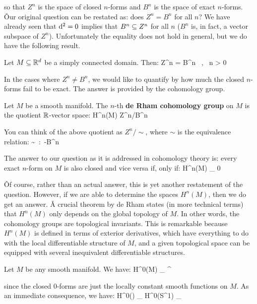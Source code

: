 so that $Z^n$ is the space of closed $n$-forms and $B^n$ is the space of exact $n$-forms. \v

Our original question can be restated as: does $Z^n=B^n$ for all $n$? We have already seen that $\mathrm{d}^2=0$ implies that
$B^n\subseteq Z^n$ for all $n$ ($B^n$ is, in fact, a vector subspace of $Z^n$). Unfortunately the equality does not hold in
general, but we do have the following result.

Let $M\subseteq \mathbb{R}^d$ be a simply connected domain. Then:
\bse
Z^n = B^n \, , \qquad \forall \, n > 0
\ese
\et

In the cases where $Z^n\neq B^n$, we would like to quantify by how much the closed $n$-forms fail to be exact. The
answer is provided by the cohomology group.

Let $M$ be a smooth manifold. The $n$-th \textbf{de Rham cohomology group} on $M$ is the quotient $\mathbb{R}$-vector space:
\bse
H^n(M) \coloneqq Z^n/B^n
\ese
\ed

You can think of the above quotient as $Z^n/\!\sim$, where $\sim$ is the equivalence relation:
\bse
\omega \sim \sigma\ :\Leftrightarrow\ \omega-\sigma \in B^n
\ese

The answer to our question as it is addressed in cohomology theory is: every exact $n$-form on $M$ is also closed and
vice versa if, only if:
\bse
H^n(M) \cong_ 0
\ese

\v

Of course, rather than an actual answer, this is yet another restatement of the question. However, if we are able to
determine the spaces $H^n(M)$, then we do get an answer. \v

A crucial theorem by de Rham states (in more technical terms) that $H^n(M)$ only depends on the global topology of
$M$. In other words, the cohomology groups are topological invariants. This is remarkable because $H^n(M)$ is defined
in terms of exterior derivatives, which have everything to do with the local differentiable structure of $M$, and a
given topological space can be equipped with several inequivalent differentiable structures.

\be
Let $M$ be any smooth manifold. We have:
\bse
H^0(M) \cong_ \R^{}
\ese

since the closed $0$-forms are just the locally constant smooth functions on $M$. As an immediate consequence, we have:
\bse
H^0(\R) \cong_ H^0(S^1) \cong_ \R
\ese
\ee

